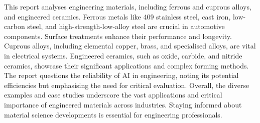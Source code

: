\documentclass[../main.tex]{subfiles}
\begin{document}
This report analyses engineering materials, including ferrous and cuprous alloys, and engineered ceramics.
Ferrous metals like 409 stainless steel, cast iron, low-carbon steel, and high-strength-low-alloy steel are crucial in automotive components.
Surface treatments enhance their performance and longevity.
Cuprous alloys, including elemental copper, brass, and specialised alloys, are vital in electrical systems.
Engineered ceramics, such as oxide, carbide, and nitride ceramics, showcase their significant applications and complex forming methods.
The report questions the reliability of AI in engineering, noting its potential efficiencies but emphasising the need for critical evaluation.
Overall, the diverse examples and case studies underscore the vast applications and critical importance of engineered materials across industries.
Staying informed about material science developments is essential for engineering professionals.
\end{document}
